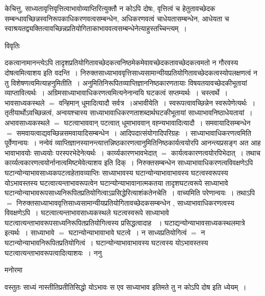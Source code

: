 \documentclass[10pt, openany]{book}
\begin{document}
{ केचित्तु, साध्यतावृत्तिवृत्तित्वाभावोव्याप्तिरित्युक्तौ न कोऽपि दोषः, वृत्तित्वं च हेतुतावच्छेदक सम्बन्धावच्छिन्नस्वनिरूपकाधिकरणवत्वसम्बन्धेन, अधिकरणवत्वं
चाधेयतासम्बन्धेन, आधेयता च स्वाश्रयतद्व्यक्तित्वावच्छिन्नप्रतियोगिताकाभाववत्वसम्बन्धेनेत्याहुस्तच्चिन्त्यम्~।
\newpage
\begin{center}     विवृतिः \end{center}
दकत्वानामानन्त्येऽपि तादृशप्रतियोगितावच्छेदकत्वनिष्ठमेकमेवावच्छेदकतावच्छेदकत्वमतो न गौरवस्य दोषत्वमित्याशय इति वदन्ति~। निरुक्तसाध्याभाववृत्तिसाध्यसामान्यीयप्रतियोगितावच्छेदकत्वस्योपलक्षणत्वं न तु विशेषणत्वमित्याहनुमितीति~। अनुमितिनिरूपितव्याप्तिज्ञाननिष्ठकारणतायाः विषयतयावच्छेदकीभूतायां व्याप्तावित्यर्थः~। अग्रिमसाध्याभावाधिकरणत्वमित्यनेनान्वयि घटकत्वं सप्तम्यर्थः~। चस्त्वर्थे~। भावसाध्यकस्थले $=$ वन्हिमान् धूमादित्यादौ सर्वत्र~।{\la अभावीयेति}~। स्वरूपत्वावच्छिन्नेन स्वरूपेणेत्यर्थः~। तृतीयार्थोऽवच्छिन्नत्वं, अन्वयश्चास्य साध्याभावाधिकरणताशब्दार्थघटकीभूतायां साध्याभावनिष्ठाधेयतायां~। अभावसाध्यकस्थले $=$ घटत्वाभाववान् पटत्वात् धूमाभाववान् वह्न्यभावादित्यादौ~। समवायादिसम्बन्धेन $=$ समवायत्वाद्यवच्छिन्नसमवायादिसम्बन्धेन~। आदिपदात्संयोगादिपरिग्रहः~। साध्याभावाधिकरणत्वमिति पूर्वेणान्वयः~। नन्वेवं
व्याप्तिज्ञानस्यानन्त्यात्तन्निष्ठकारणत्वानुमितिनिष्ठकार्यत्वयोरपि आनन्त्यप्रसङ्ग अत आह भावाभावयोः
साध्ययोः परस्परभेदेनेत्यर्थः~। कार्य्यकारणभावभेदात् $=$ कार्यत्वकारणत्वयोरपिभेदात्~। तथाच कार्य्यत्वकारणत्वयोर्नानात्वमिष्टमेवेत्याशय इति दिक्~। निरुक्तसम्बन्धेन साध्याभावाधिकरणत्वविवक्षणेऽपि घटान्योन्याभावसाध्यकपटत्वहेतावव्याप्तिः साध्याभावस्य घटान्योन्याभावाभावस्य घटत्वस्वरूपस्य योऽभावस्तस्य घटत्वात्यन्ताभावरूपत्वेन घटान्योन्याभावानात्मकतया तादृशघटत्वरूपे साध्याभावे घटान्योन्याभावरूपसाध्यनिरूपितप्रतियोगित्वाऽप्रसिद्धेरित्याशंकतेनचेति~। वाच्यमिति परेणान्वयः~। तथाऽपि $=$ निरुक्तसाध्याभाववृत्तिसाध्यसामान्यीयप्रतियोगितावच्छेदकसम्बन्धेन , साध्याभावाधिकरणत्वस्य विवक्षणेऽपि~। घटत्वात्यन्ताभावसाध्यकस्थले घटत्वस्वरूपे साध्याभावे घटत्वात्यन्ताभावरूपसाध्यनिरूपितप्रतियोगित्वस्य प्रसिद्धत्वादाह ~। घटाद्यन्योन्याभावसाध्यकस्थलमात्रे इत्यर्थः~। साध्याभावे $=$ घटान्योन्याभावाभावे घटत्वे~। न साध्यप्रतियोगित्वं $=$  न घटान्योन्याभावनिरूपितप्रतियोगित्वं~। घटान्योन्याभावाभावस्य घटत्वस्य योऽभावस्तस्य घटत्वात्यन्ताभावरूपत्वादित्याशयः~। ननु
\begin{center}   मनोरमा  \end{center}

वस्तुतः साध्यं नास्तीतिप्रतीतिसिद्धो योऽभावः स एव साध्याभाव इतिमते तु न कोऽपि दोष इति ध्येयम्~।\\

}
\end{document}
